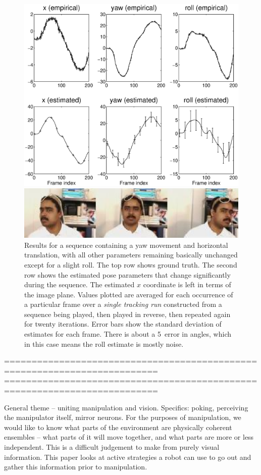\begin{figure}[tbp]
\centerline{\includegraphics[width=\columnwidth]{yaw-roll-result.eps}}
\centerline{\includegraphics[width=\columnwidth]{yaw-extremes.eps}}
\caption{ 
%
Results for a sequence containing a yaw movement and horizontal
translation, with all other parameters remaining basically unchanged
except for a slight roll.  The top row shows ground truth.  The second
row shows the estimated pose parameters that change significantly
during the sequence.  The estimated $x$ coordinate is left in terms of
the image plane.  Values plotted are averaged for each
occurrence of a particular frame over a {\em single tracking run}
constructed from a sequence being played, then played in reverse, then
repeated again for twenty iterations.  Error bars show the standard
deviation of estimates for each frame.  There is about a 5\dgrs\ error
in angles, which in this case means the roll estimate is mostly noise.
%
}
\label{fig:yaw-roll-result}
\end{figure}




==========================================================================
==========================================================================


General theme -- uniting manipulation and vision.
Specifics: poking, perceiving the manipulator itself, mirror neurons.
For the purposes of manipulation, we would like to know what parts of
the environment are physically coherent ensembles -- what parts of it
will move together, and what parts are more or less independent.  This
is a difficult judgement to make from purely visual information.  This
paper looks at active strategies a robot can use to go out and gather
this information prior to manipulation.



